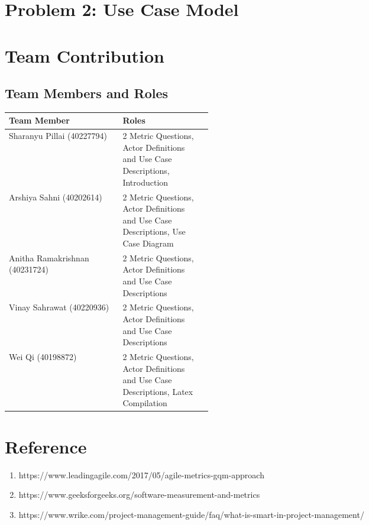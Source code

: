 \documentclass[english,12pt,a4paper]{report}
\begin{document}
	\chapter{Problem 2: Use Case Model}
	
	
	\chapter{Team Contribution}
	\section{Team Members and Roles}
	\begin{center}
		\begin{tabular}{|l|p{0.4\linewidth}|l|}
			\hline
			\textbf{Team Member} & \textbf{Roles}\\
			\hline
			Sharanyu Pillai (40227794) & 2 Metric Questions, Actor Definitions and Use Case Descriptions, Introduction\\
			\hline
			Arshiya Sahni (40202614) & 2 Metric Questions, Actor Definitions and Use Case Descriptions, Use Case Diagram\\
			\hline
			Anitha Ramakrishnan (40231724) & 2 Metric Questions, Actor Definitions and Use Case Descriptions\\
			\hline
			Vinay Sahrawat (40220936) & 2 Metric Questions, Actor Definitions and Use Case Descriptions\\
			\hline
			Wei Qi (40198872) & 2 Metric Questions, Actor Definitions and Use Case Descriptions, Latex Compilation \\
			\hline
		\end{tabular}
	\end{center}

	\chapter{Reference}
	\begin{enumerate}
	\item https://www.leadingagile.com/2017/05/agile-metrics-gqm-approach
	\item https://www.geeksforgeeks.org/software-measurement-and-metrics
	\item https://www.wrike.com/project-management-guide/faq/what-is-smart-in-project-management/ 
	
	\end{enumerate}
	
	
\end{document}
